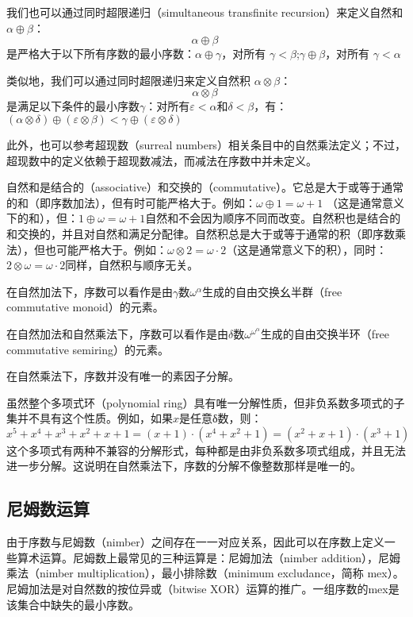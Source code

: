 我们也可以通过同时超限递归（simultaneous transfinite recursion）来定义自然和 \(\alpha \oplus \beta\)：  
\[
\alpha \oplus \beta~
\]
是严格大于以下所有序数的最小序数：\(\alpha \oplus \gamma\)，对所有 \(\gamma < \beta\);\(\gamma \oplus \beta\)，对所有 \(\gamma < \alpha\)

类似地，我们可以通过同时超限递归来定义自然积 \(\alpha \otimes \beta\)：  
\[
\alpha \otimes \beta~
\]
是满足以下条件的最小序数\(\gamma\)：对所有\(\varepsilon < \alpha\)和\(\delta < \beta\)，有：\((\alpha \otimes \delta) \oplus (\varepsilon \otimes \beta) < \gamma \oplus (\varepsilon \otimes \delta)\)

此外，也可以参考超现数（surreal numbers）相关条目中的自然乘法定义；不过，超现数中的定义依赖于超现数减法，而减法在序数中并未定义。

自然和是结合的（associative）和交换的（commutative）。它总是大于或等于通常的和（即序数加法），但有时可能严格大于。例如：\(\omega\oplus1=\omega+1\)
（这是通常意义下的和），但：\(1 \oplus \omega = \omega + 1\)自然和不会因为顺序不同而改变。自然积也是结合的和交换的，并且对自然和满足分配律。自然积总是大于或等于通常的积（即序数乘法），但也可能严格大于。例如：\(\omega \otimes 2 = \omega \cdot 2\)（这是通常意义下的积），同时：\(2 \otimes \omega =\omega \cdot 2\)同样，自然积与顺序无关。

在自然加法下，序数可以看作是由\(\gamma\)数\(\omega^\alpha\)生成的自由交换幺半群（free commutative monoid）的元素。  

在自然加法和自然乘法下，序数可以看作是由\(\delta\)数\(\omega^{\omega^\alpha}\)生成的自由交换半环（free commutative semiring）的元素。  

在自然乘法下，序数并没有唯一的素因子分解。  

虽然整个多项式环（polynomial ring）具有唯一分解性质，但非负系数多项式的子集并不具有这个性质。例如，如果\(x\)是任意δ数，则：
\[
x^5 + x^4 + x^3 + x^2 + x + 1 = (x+1)\cdot (x^4 + x^2 + 1) = (x^2 + x + 1)\cdot (x^3 + 1)~
\]
这个多项式有两种不兼容的分解形式，每种都是由非负系数多项式组成，并且无法进一步分解。这说明在自然乘法下，序数的分解不像整数那样是唯一的。
\subsection{尼姆数运算}
由于序数与尼姆数（nimber）之间存在一一对应关系，因此可以在序数上定义一些算术运算。尼姆数上最常见的三种运算是：尼姆加法（nimber addition），尼姆乘法（nimber multiplication），最小排除数（minimum excludance，简称 mex）。尼姆加法是对自然数的按位异或（bitwise XOR）运算的推广。一组序数的mex是该集合中缺失的最小序数。  
